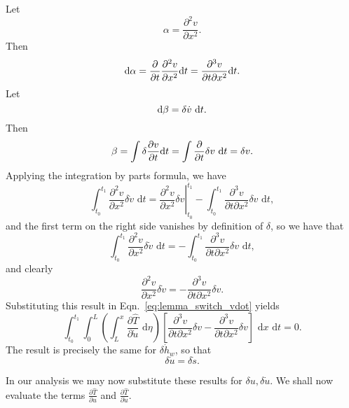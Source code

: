 Let
\begin{equation}
\alpha = \frac{\partial^2 v}{\partial x^2}.
\end{equation}
Then
\begin{equation}
\text d\alpha = \frac{\partial}{\partial t}\frac{\partial^2 v}{\partial x^2}\text dt = \frac{\partial^3 v}{\partial t\partial x^2}\text dt.
\end{equation}
Let
\begin{equation}
\text d\beta = \delta\dot v\text{ d}t.
\end{equation}
Then
\begin{equation}
\beta = \int \delta\frac{\partial v}{\partial t}\text dt = \int\frac{\partial}{\partial t} \delta v\text{ d}t = \delta v.
\end{equation}
Applying the integration by parts formula, we have
\begin{equation}
\int_{t_0}^{t_1}\frac{\partial^2 v}{\partial x^2}\delta \dot v\text{ d}t = \left.\frac{\partial^2v}{\partial x^2}\delta v\right|_{t_0}^{t_1} - \int_{t_0}^{t_1}\frac{\partial^3 v}{\partial t\partial x^2}\delta v\text{ d}t,
\end{equation}
and the first term on the right side vanishes by definition of $\delta$, so we have that 
\begin{equation}
\int_{t_0}^{t_1}\frac{\partial^2 v}{\partial x^2}\delta \dot v\text{ d}t =- \int_{t_0}^{t_1}\frac{\partial^3 v}{\partial t\partial x^2}\delta v\text{ d}t,
\end{equation}
and clearly
\begin{equation}
\frac{\partial^2 v}{\partial x^2}\delta \dot v=-\frac{\partial^3 v}{\partial t\partial x^2}\delta v.
\end{equation}
Substituting this result in Eqn.~\ref{eq:lemma_switch_vdot} yields
\begin{equation}
\int_{t_0}^{t_1}\int_0^L\left(\int_L^x\frac{\partial\hat T}{\partial \dot u}\text{ d}\eta\right)\left[\frac{\partial^3v}{\partial t\partial x^2}\delta v-\frac{\partial^3v}{\partial t\partial x^2}\delta v\right]\text{ d}x\text{ d}t = 0.
\end{equation}
The result is precisely the same for $\delta\dot h_w$, so that 
\begin{equation}
\delta\dot u = \delta\dot s.
\end{equation}

In our analysis we may now substitute these results for $\delta u,\delta\dot u$. We shall now evaluate the terms $\frac{\partial \hat T}{\partial u}$ and $\frac{\partial \hat T}{\partial \dot u}$.

